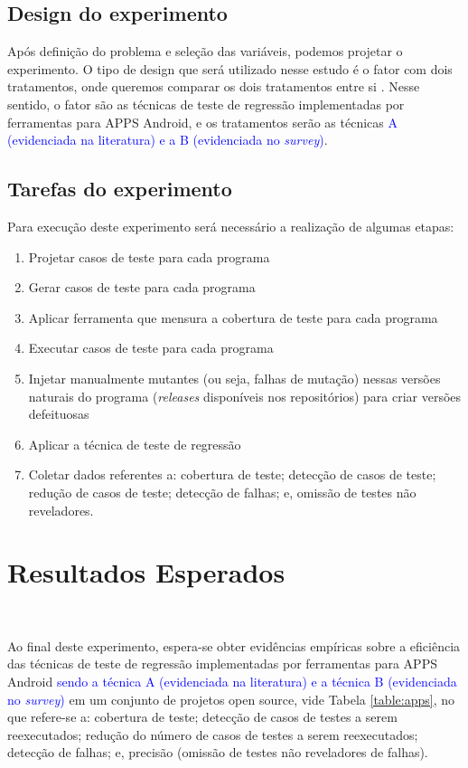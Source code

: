 \subsection{Design do experimento}

Após definição do problema e seleção das variáveis, podemos projetar o experimento. O tipo de design que será utilizado nesse estudo é o fator com dois tratamentos, onde queremos comparar os dois tratamentos entre si \cite{Wohlin:2012:ESE:2349018}. Nesse sentido, o fator são as técnicas de teste de regressão implementadas por ferramentas para \ac{APPS} Android, e os tratamentos serão as técnicas \textcolor{blue}{A (evidenciada na literatura) e a B (evidenciada no \textit{survey})}.


\subsection{Tarefas do experimento}

Para execução deste experimento será necessário a realização de algumas etapas:


\begin{enumerate}

    \item Projetar casos de teste para cada programa
    \item Gerar casos de teste para cada programa
    \item Aplicar ferramenta que mensura a cobertura de teste para cada programa
    \item Executar casos de teste para cada programa
    \item Injetar manualmente mutantes (ou seja, falhas de mutação) nessas versões naturais do programa (\textit{releases} disponíveis nos repositórios) para criar versões defeituosas
    \item Aplicar a técnica de teste de regressão
    \item Coletar dados referentes a: cobertura de teste; detecção de casos de teste; redução de casos de teste; detecção de falhas; e, omissão de testes não reveladores.

\end{enumerate}

\section{Resultados Esperados}\\\label{sec:resultadosesperadospe}

Ao final deste experimento, espera-se obter evidências empíricas sobre a eficiência das técnicas de teste de regressão implementadas por ferramentas para \ac{APPS} Android \textcolor{blue}{sendo a técnica A (evidenciada na literatura) e a técnica B (evidenciada no \textit{survey})} em um conjunto de projetos open source, vide Tabela \ref{table:apps}, no que refere-se a: cobertura de teste; detecção de casos de testes a serem reexecutados; redução do número de casos de testes a serem reexecutados; detecção de falhas; e, precisão (omissão de testes não reveladores de falhas).

